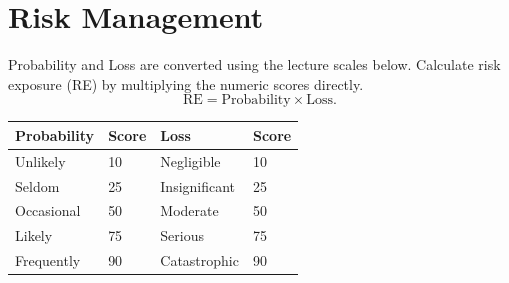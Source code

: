 \section{Risk Management}

Probability and Loss are converted using the lecture scales below. Calculate risk exposure (RE) by multiplying the numeric scores directly.
\[
\mathrm{RE}=\mathrm{Probability}\times\mathrm{Loss}.
\]

\begin{tabular}{@{}L{0.25\textwidth}L{0.12\textwidth}L{0.35\textwidth}L{0.12\textwidth}@{}}
\toprule
Probability & Score & Loss & Score \\
\midrule
Unlikely & 10 & Negligible & 10 \\
Seldom & 25 & Insignificant & 25 \\
Occasional & 50 & Moderate & 50 \\
Likely & 75 & Serious & 75 \\
Frequently & 90 & Catastrophic & 90 \\
\bottomrule
\end{tabular}

